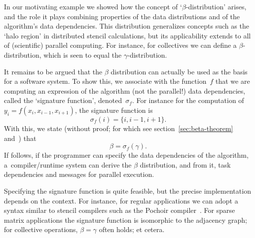 
\label{sec:define-signature}

In our motivating example we showed how the concept of
`$\beta$-distribution' arises, and the role it plays combining
properties of the data distributions and of the algorithm's data dependencies.
This distribution generalizes concepts such as the `halo region'
in distributed stencil calculations, but its applicability extends to
all of (scientific) parallel computing.
%
For instance, for collectives we can define a $\beta$-distribution,
which is seen to equal the $\gamma$-distribution.

It remains to be argued that the $\beta$ distribution can actually
be used as the basis for a software system.
To show this, we associate with the function~$f$
that we are computing an expression of the algorithm
(not the parallel!) data dependencies,
called the `signature function',
denoted~$\sigma_f$. For instance for the computation
of $y_i=f(x_i,x_{i-1},x_{i+1})$, the signature function is
\[ \sigma_f(i)=\{i,i-1,i+1\}. \]
With this, we state 
(without proof; for which see section~\ref{sec:beta-theorem} and~\cite{IMP-01})
that
\[ \beta=\sigma_f(\gamma). \]
If follows, if the programmer can specify the data dependencies of
the algorithm, a~compiler/runtime system can derive the $\beta$ distribution,
and from it, task dependencies and messages for parallel execution.

Specifying the signature function is quite feasible, but the precise
implementation depends on the context. For instance, for regular applications
we can adopt a syntax similar to stencil compilers such as
the Pochoir compiler~\cite{Tang:2011:pochoir}. For sparse matrix
applications the signature function is isomorphic to the adjacency
graph; for collective operations, $\beta=\gamma$ often holds; et cetera.

